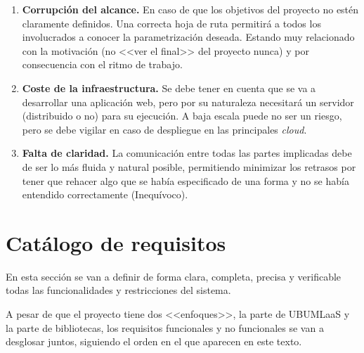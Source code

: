 \begin{enumerate}
\item \textbf{Corrupción del alcance.} En caso de que los objetivos del proyecto no estén claramente definidos. Una correcta hoja de ruta permitirá a todos los involucrados a conocer la parametrización deseada. Estando muy relacionado con la motivación (no <<ver el final>> del proyecto nunca) y por consecuencia con el ritmo de trabajo.
\item \textbf{Coste de la infraestructura.} Se debe tener en cuenta que se va a desarrollar una aplicación web, pero por su naturaleza necesitará un servidor (distribuido o no) para su ejecución. A baja escala puede no ser un riesgo, pero se debe vigilar en caso de despliegue en las principales \textit{cloud}.
\item \textbf{Falta de claridad.} La comunicación entre todas las partes implicadas debe de ser lo más fluida y natural posible, permitiendo minimizar los retrasos por tener que rehacer algo que se había especificado de una forma y no se había entendido correctamente (Inequívoco).
\end{enumerate}

\section{Catálogo de requisitos}\label{catalogo-de-riquisitos}
En esta sección se van a definir de forma clara, completa, precisa y verificable todas las funcionalidades y restricciones del sistema.

A pesar de que el proyecto tiene dos <<enfoques>>, la parte de UBUMLaaS y la parte de bibliotecas, los requisitos funcionales y no funcionales se van a desglosar juntos, siguiendo el orden en el que aparecen en este texto.

